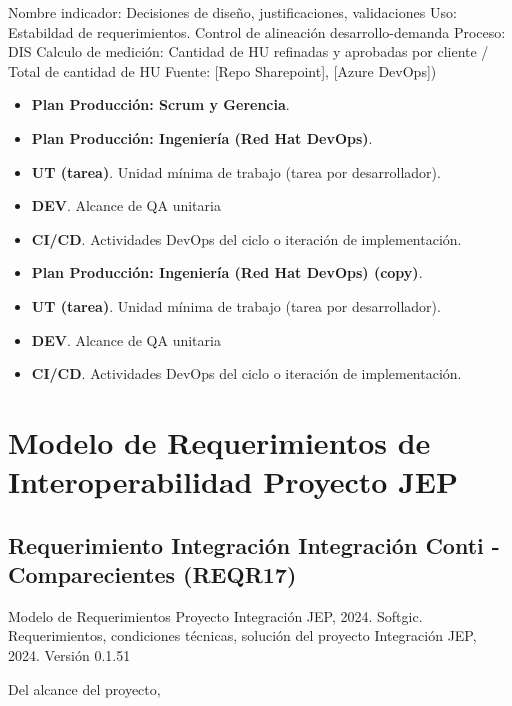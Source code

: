 \documentclass[
  paper=a4,
  ,captions=tableheading
]{scrartcl}
\renewenvironment{quote}{\begin{customblockquote}\list{}{\rightmargin=0em\leftmargin=0em}%
\item\relax\color{blockquote-text}\ignorespaces}{\unskip\unskip\endlist\end{customblockquote}}
\begin{document}
Nombre indicador: Decisiones de diseño, justificaciones, validaciones
Uso: Estabildad de requerimientos. Control de alineación
desarrollo-demanda Proceso: DIS Calculo de medición: Cantidad de HU
refinadas y aprobadas por cliente / Total de cantidad de HU Fuente:
{[}Repo Sharepoint{]}, {[}Azure DevOps{]})

\begin{itemize}
\item
  \textbf{Plan Producción: Scrum y Gerencia}.
\item
  \textbf{Plan Producción: Ingeniería (Red Hat DevOps)}.
\item
  \textbf{UT (tarea)}. Unidad mínima de trabajo (tarea por
  desarrollador).
\item
  \textbf{DEV}. Alcance de QA unitaria
\item
  \textbf{CI/CD}. Actividades DevOps del ciclo o iteración de
  implementación.
\item
  \textbf{Plan Producción: Ingeniería (Red Hat DevOps) (copy)}.
\item
  \textbf{UT (tarea)}. Unidad mínima de trabajo (tarea por
  desarrollador).
\item
  \textbf{DEV}. Alcance de QA unitaria
\item
  \textbf{CI/CD}. Actividades DevOps del ciclo o iteración de
  implementación.
\end{itemize}

\newpage

\section{Modelo de Requerimientos de Interoperabilidad Proyecto
JEP}\label{sec:modelo-de-requerimientos-de-interoperabilidad-proyecto-jep}

\subsection{Requerimiento Integración Integración Conti - Comparecientes
(REQR17)}\label{sec:requerimiento-integraciuxf3n-integraciuxf3n-conti---comparecientes-reqr17}

\begin{quote}
Modelo de Requerimientos Proyecto Integración JEP, 2024. Softgic.
Requerimientos, condiciones técnicas, solución del proyecto Integración
JEP, 2024. Versión 0.1.51
\end{quote}

Del alcance del proyecto,
\end{document}
